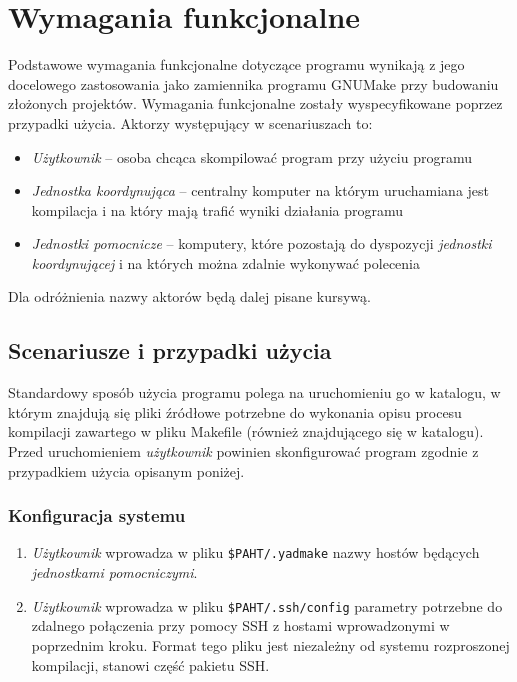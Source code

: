 \documentclass[a4paper]{article}
\begin{document}
\section{Wymagania funkcjonalne}

Podstawowe wymagania funkcjonalne dotyczące programu wynikają z jego docelowego zastosowania jako zamiennika programu GNUMake przy budowaniu złożonych projektów. Wymagania funkcjonalne zostały wyspecyfikowane poprzez przypadki użycia. Aktorzy występujący w scenariuszach to:
\begin{itemize}
	\item \emph{Użytkownik} -- osoba chcąca skompilować program przy użyciu programu
	\item \emph{Jednostka koordynująca} -- centralny komputer na którym uruchamiana jest kompilacja i na który mają trafić wyniki działania programu
	\item \emph{Jednostki pomocnicze} -- komputery, które pozostają do dyspozycji \emph{jednostki koordynującej} i na których można zdalnie wykonywać polecenia
\end{itemize}

Dla odróżnienia nazwy aktorów będą dalej pisane kursywą.

\subsection{Scenariusze i przypadki użycia}

Standardowy sposób użycia programu polega na uruchomieniu go w katalogu, w którym znajdują się pliki źródłowe potrzebne do wykonania opisu procesu kompilacji zawartego w pliku Makefile (również znajdującego się w katalogu). Przed uruchomieniem \emph{użytkownik} powinien skonfigurować program zgodnie z przypadkiem użycia opisanym poniżej.

\subsubsection{Konfiguracja systemu}

\begin{enumerate}
	\item \emph{Użytkownik} wprowadza w pliku \verb+$PAHT/.yadmake+ nazwy hostów będących \emph{jednostkami pomocniczymi}.
	\item \emph{Użytkownik} wprowadza w pliku \verb+$PAHT/.ssh/config+ parametry potrzebne do zdalnego połączenia przy pomocy SSH z hostami wprowadzonymi w poprzednim kroku. Format tego pliku jest niezależny od systemu rozproszonej kompilacji, stanowi część pakietu SSH.
\end{enumerate}
\end{document}
